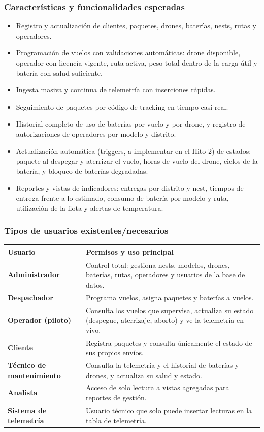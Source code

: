 \documentclass[11pt,a4paper]{article}
\begin{document}
\subsubsection{Características y funcionalidades esperadas}
\begin{itemize}
\item Registro y actualización de clientes, paquetes, drones, baterías, nests, rutas y operadores.
\item Programación de vuelos con validaciones automáticas: drone disponible, operador con licencia vigente, ruta activa, peso total dentro de la carga útil y batería con salud suficiente.
\item Ingesta masiva y continua de telemetría con inserciones rápidas.
\item Seguimiento de paquetes por código de tracking en tiempo casi real.
\item Historial completo de uso de baterías por vuelo y por drone, y registro de autorizaciones de operadores por modelo y distrito.
\item Actualización automática (triggers, a implementar en el Hito 2) de estados: paquete al despegar y aterrizar el vuelo, horas de vuelo del drone, ciclos de la batería, y bloqueo de baterías degradadas.
\item Reportes y vistas de indicadores: entregas por distrito y nest, tiempos de entrega frente a lo estimado, consumo de batería por modelo y ruta, utilización de la flota y alertas de temperatura.
\end{itemize}

\subsubsection{Tipos de usuarios existentes/necesarios}
\begin{center}
\begin{tabularx}{\textwidth}{>{\bfseries}l X}
\toprule
Usuario & Permisos y uso principal \\
\midrule
Administrador & Control total: gestiona nests, modelos, drones, baterías, rutas, operadores y usuarios de la base de datos. \\
Despachador & Programa vuelos, asigna paquetes y baterías a vuelos. \\
Operador (piloto) & Consulta los vuelos que supervisa, actualiza su estado (despegue, aterrizaje, aborto) y ve la telemetría en vivo. \\
Cliente & Registra paquetes y consulta únicamente el estado de sus propios envíos. \\
Técnico de mantenimiento & Consulta la telemetría y el historial de baterías y drones, y actualiza su salud y estado. \\
Analista & Acceso de solo lectura a vistas agregadas para reportes de gestión. \\
Sistema de telemetría & Usuario técnico que solo puede insertar lecturas en la tabla de telemetría. \\
\bottomrule
\end{tabularx}
\end{center}
\end{document}
